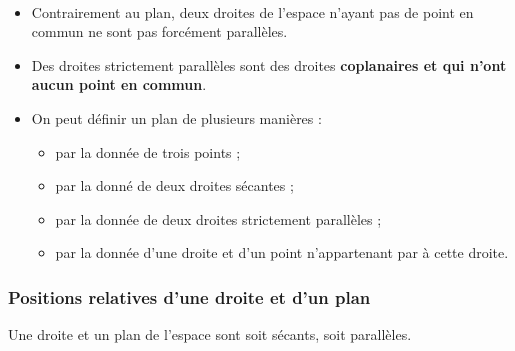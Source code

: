 
\begin{rmqs}~
\begin{itemize}
\item Contrairement au plan, deux droites de l'espace n'ayant pas de point en commun ne sont pas forcément parallèles.
\item Des droites strictement parallèles sont des droites \textbf{coplanaires et qui n'ont aucun point en commun}.
	\item On peut définir un plan de plusieurs manières :
			\begin{itemize}
				\item par la donnée de trois points ;
				\item par la donné de deux droites sécantes ;
				\item par la donnée de deux droites strictement parallèles ;
				\item par la donnée d'une droite et d'un point n'appartenant par à cette droite.
			\end{itemize}
\end{itemize}
\end{rmqs}

\sautpage

\subsubsection{Positions relatives d'une droite et d'un plan}

\begin{regle}
Une droite et un plan de l'espace sont soit sécants, soit parallèles.
\end{regle}

